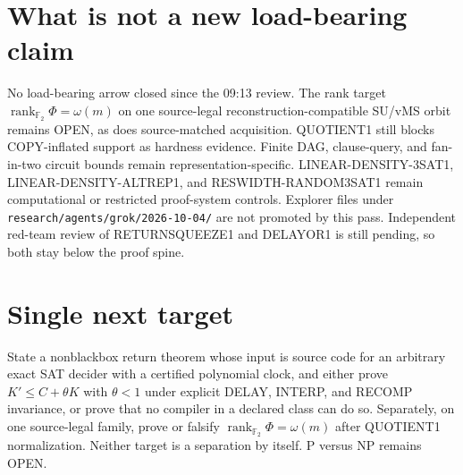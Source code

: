 \documentclass[11pt]{article}
\begin{document}
\section*{What is not a new load-bearing claim}
No load-bearing arrow closed since the 09:13 review. The rank target
\(\operatorname{rank}_{\mathbb F_2}\Phi=\omega(m)\)
on one source-legal reconstruction-compatible SU/vMS orbit remains OPEN, as does
source-matched acquisition. QUOTIENT1 still blocks COPY-inflated support as hardness
evidence. Finite DAG, clause-query, and fan-in-two circuit bounds remain
representation-specific. LINEAR-DENSITY-3SAT1, LINEAR-DENSITY-ALTREP1, and
RESWIDTH-RANDOM3SAT1 remain computational or restricted proof-system controls.
Explorer files under \texttt{research/agents/grok/2026-10-04/} are not promoted by this
pass. Independent red-team review of RETURNSQUEEZE1 and DELAYOR1 is still pending, so
both stay below the proof spine.

\section*{Single next target}
State a nonblackbox return theorem whose input is source code for an arbitrary exact SAT
decider with a certified polynomial clock, and either prove
\(K'\le C+\theta K\) with \(\theta<1\) under explicit DELAY, INTERP, and RECOMP
invariance, or prove that no compiler in a declared class can do so. Separately, on one
source-legal family, prove or falsify
\(\operatorname{rank}_{\mathbb F_2}\Phi=\omega(m)\)
after QUOTIENT1 normalization. Neither target is a separation by itself.
P versus NP remains OPEN.

\end{document}
